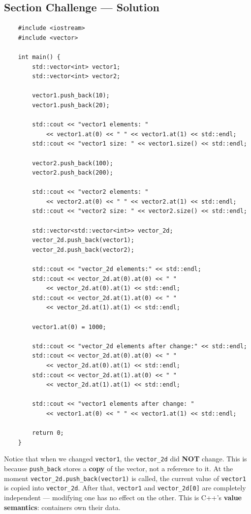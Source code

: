 \subsection{Section Challenge --- Solution}
\begin{lstlisting}
	#include <iostream>
	#include <vector>

	int main() {
		std::vector<int> vector1;
		std::vector<int> vector2;

		vector1.push_back(10);
		vector1.push_back(20);

		std::cout << "vector1 elements: "
			<< vector1.at(0) << " " << vector1.at(1) << std::endl;
		std::cout << "vector1 size: " << vector1.size() << std::endl;

		vector2.push_back(100);
		vector2.push_back(200);

		std::cout << "vector2 elements: "
			<< vector2.at(0) << " " << vector2.at(1) << std::endl;
		std::cout << "vector2 size: " << vector2.size() << std::endl;

		std::vector<std::vector<int>> vector_2d;
		vector_2d.push_back(vector1);
		vector_2d.push_back(vector2);

		std::cout << "vector_2d elements:" << std::endl;
		std::cout << vector_2d.at(0).at(0) << " "
			<< vector_2d.at(0).at(1) << std::endl;
		std::cout << vector_2d.at(1).at(0) << " "
			<< vector_2d.at(1).at(1) << std::endl;

		vector1.at(0) = 1000;

		std::cout << "vector_2d elements after change:" << std::endl;
		std::cout << vector_2d.at(0).at(0) << " "
			<< vector_2d.at(0).at(1) << std::endl;
		std::cout << vector_2d.at(1).at(0) << " "
			<< vector_2d.at(1).at(1) << std::endl;

		std::cout << "vector1 elements after change: "
			<< vector1.at(0) << " " << vector1.at(1) << std::endl;

		return 0;
	}
\end{lstlisting}

\begin{remark}
	Notice that when we changed \texttt{vector1}, the \texttt{vector\_2d} did \textbf{NOT} change. This is because \texttt{push\_back} stores a \textbf{copy} of the vector, not a reference to it. At the moment \texttt{vector\_2d.push\_back(vector1)} is called, the current value of \texttt{vector1} is copied into \texttt{vector\_2d}. After that, \texttt{vector1} and \texttt{vector\_2d[0]} are completely independent — modifying one has no effect on the other. This is C++'s \textbf{value semantics}: containers own their data.
\end{remark}

